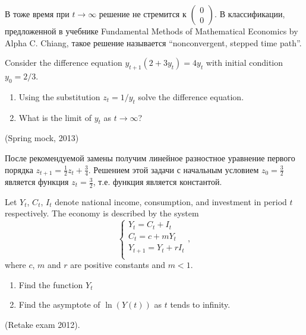 \begin{solution}


В тоже время при $t\to \infty $ решение не стремится к $\left(\begin{array}{c} {0} \\ {0} \end{array}\right)$. В классификации, предложенной в учебнике Fundamental Methods of Mathematical Economics by Alpha C. Chiang, такое решение называется ``nonconvergent, stepped time path''.
\end{solution}


\begin{problem}
Consider the difference equation $y_{t+1}(2+3y_t)=4y_t$ with initial condition $y_0=2/3$.
\begin{enumerate}
\item Using the substitution $z_t=1/y_t$ solve the difference equation.
\item What is the limit of $y_t$ as $t\to\infty$?
\end{enumerate}  
(Spring mock, 2013)
\end{problem}

\begin{solution}
После рекомендуемой замены получим линейное разностное уравнение первого порядка  $z_{t+1}=\frac{1}{2}z_t+\frac{3}{4}$. Решением этой задачи с начальным условием $z_0=\frac{3}{2}$ является функция $z_t=\frac{3}{2}$, т.е. функция является константой.
\end{solution}



\begin{problem}
 Let $Y_t$, $C_t$, $I_t$ denote national income, consumption, and investment in period $t$ respectively. The economy is described by the system
\begin{equation}
\begin{cases}
Y_t=C_t+I_t\\
C_t=c+mY_t\\
Y_{t+1}=Y_{t}+rI_t \\
\end{cases},
\end{equation}
where $c$, $m$ and $r$ are positive constants and $m<1$.
\begin{enumerate}
\item Find the function $Y_t$
\item Find the asymptote of $\ln(Y(t))$ as $t$ tends to infinity.
\end{enumerate}
(Retake exam 2012).
\end{problem}

